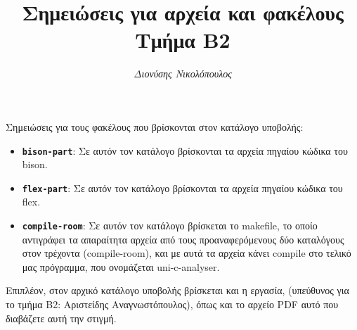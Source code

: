\documentclass[14pt]{extarticle}
\title{\bf Σημειώσεις για αρχεία και φακέλους \\ Τμήμα B2}
\author{
  \emph{Διονύσης Νικολόπουλος}
}
\begin{document}
\maketitle
Σημειώσεις για τους φακέλους που βρίσκονται στον κατάλογο υποβολής:
\begin{itemize}
\item \texttt{\textbf{bison-part}}:
Σε αυτόν τον κατάλογο βρίσκονται τα αρχεία πηγαίου κώδικα του bison.
\item \texttt{\textbf{flex-part}}:
Σε αυτόν τον κατάλογο βρίσκονται τα αρχεία πηγαίου κώδικα του flex.
\item \texttt{\textbf{compile-room}}:
Σε αυτόν τον κατάλογο βρίσκεται το makefile, το οποίο αντιγράφει τα απαραίτητα
αρχεία από τους προαναφερόμενους δύο καταλόγους στον τρέχοντα (compile-room),
και με αυτά τα αρχεία κάνει compile στο τελικό μας πρόγραμμα, που ονομάζεται
uni-c-analyser.
\end{itemize}
Επιπλέον, στον αρχικό κατάλογο υποβολής βρίσκεται και η εργασία, (υπεύθυνος για 
το τμήμα Β2: Αριστείδης Αναγνωστόπουλος), όπως και το αρχείο PDF αυτό που
διαβάζετε αυτή την στιγμή.
\end{document}
